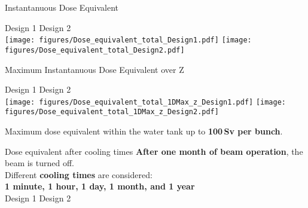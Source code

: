 \documentclass[xcolor={dvipsnames}]{beamer}
\begin{document}
\begin{frame}{Instantanuous Dose Equivalent}
\begin{center}
\hspace*{1.8cm} Design 1 \hfill Design 2 \hspace*{1.8cm} \\
  \texttt{[image: figures/Dose\_equivalent\_total\_Design1.pdf]}
    \texttt{[image: figures/Dose\_equivalent\_total\_Design2.pdf]}
\end{center}
\end{frame}
\begin{frame}{Maximum Instantanuous Dose Equivalent over Z}
\begin{center}
\hspace*{1.8cm} Design 1 \hfill Design 2 \hspace*{1.8cm} \\
  \texttt{[image: figures/Dose\_equivalent\_total\_1DMax\_z\_Design1.pdf]}
    \texttt{[image: figures/Dose\_equivalent\_total\_1DMax\_z\_Design2.pdf]}
\end{center}
Maximum dose equivalent within the water tank up to \textbf{100\,Sv per bunch}.
\end{frame}
\begin{frame}{Dose equivalent after cooling times}
\textbf{After one month of beam operation}, the beam is turned off.\\
Different \textbf{cooling times} are considered:\\
\textbf{1 minute, 1 hour, 1 day, 1 month, and 1 year}\\
\hspace*{1.6cm} Design 1 \hfill Design 2 \hspace*{1.8cm} \\
  \begin{center}
  \end{center}
\end{frame}
\end{document}
